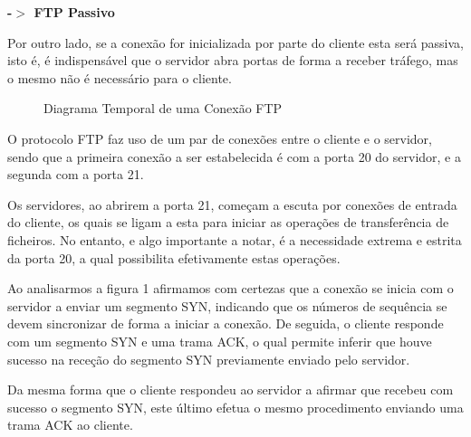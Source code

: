 \documentclass[11pt]{article}
\begin{document}
\vspace{0.5cm}

\par \textbf{-$>$ FTP Passivo}

\vspace{0.25cm}

Por outro lado, se a conexão for inicializada por parte do cliente esta será passiva, isto é, é indispensável que o servidor abra portas de forma a receber tráfego, mas o mesmo não é necessário para o cliente.

\begin{figure}[hbt!]
    \centering
    \caption{Diagrama Temporal de uma Conexão FTP}
\end{figure}

O protocolo FTP faz uso de um par de conexões entre o cliente e o servidor, sendo que a primeira conexão a ser estabelecida é com a porta 20 do servidor, e a segunda com a porta 21.

Os servidores, ao abrirem a porta 21, começam a escuta por conexões de entrada do cliente, os quais se ligam a esta para iniciar as operações de transferência de ficheiros. No entanto, e algo importante a notar, é a necessidade extrema e estrita da porta 20, a qual possibilita efetivamente estas operações.

\clearpage
Ao analisarmos a figura 1 afirmamos com certezas que a conexão se inicia com o servidor a enviar um segmento SYN, indicando que os números de sequência se devem sincronizar de forma a iniciar a conexão. De seguida, o cliente responde com um segmento SYN e uma trama ACK, o qual permite inferir que houve sucesso na receção do segmento SYN previamente enviado pelo servidor.

Da mesma forma que o cliente respondeu ao servidor a afirmar que recebeu com sucesso o segmento SYN, este último efetua o mesmo procedimento enviando uma trama ACK ao cliente.
\end{document}

